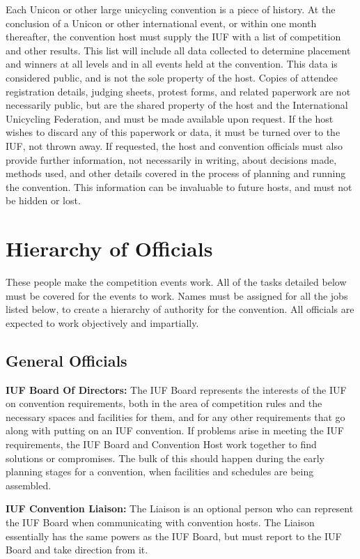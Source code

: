 Each Unicon or other large unicycling convention is a piece of history.
At the conclusion of a Unicon or other international event, or within one month thereafter, the convention host must supply the IUF with a list of competition and other results.
This list will include all data collected to determine placement and winners at all levels and in all events held at the convention.
This data is considered public, and is not the sole property of the host.
Copies of attendee registration details, judging sheets, protest forms, and related paperwork are not necessarily public, but are the shared property of the host and the International Unicycling Federation, and must be made available upon request.
If the host wishes to discard any of this paperwork or data, it must be turned over to the IUF, not thrown away.
If requested, the host and convention officials must also provide further information, not necessarily in writing, about decisions made, methods used, and other details covered in the process of planning and running the convention.
This information can be invaluable to future hosts, and must not be hidden or lost.

\section{Hierarchy of Officials}

These people make the competition events work.
All of the tasks detailed below must be covered for the events to work.
Names must be assigned for all the jobs listed below, to create a hierarchy of authority for the convention.
All officials are expected to work objectively and impartially.

\subsection{General Officials}

\textbf{IUF Board Of Directors:} The IUF Board represents the interests of the IUF on convention requirements, both in the area of competition rules and the necessary spaces and facilities for them, and for any other requirements that go along with putting on an IUF convention.
If problems arise in meeting the IUF requirements, the IUF Board and Convention Host work together to find solutions or compromises.
The bulk of this should happen during the early planning stages for a convention, when facilities and schedules are being assembled.

\textbf{IUF Convention Liaison:} The Liaison is an optional person who can represent the IUF Board when communicating with convention hosts.
The Liaison essentially has the same powers as the IUF Board, but must report to the IUF Board and take direction from it.


